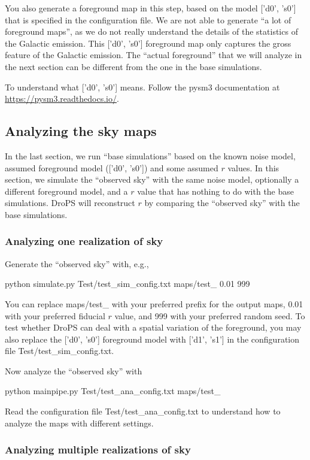 \documentclass[12pt, a4paper]{ctexart} %
\def\tbox#1{\begin{tcolorbox}#1\end{tcolorbox}}
\begin{document}
You also generate a foreground map in this step, based on the model ['d0', 's0'] that is specified in the configuration file. We are not able to generate ``a lot of foreground maps'', as we do not really understand the details of the statistics of the Galactic emission. This ['d0', 's0'] foreground map only captures the gross feature of the Galactic emission. The ``actual foreground'' that we will analyze in the next section can be different from the one in the base simulations.

To understand what ['d0', 's0'] means. Follow the pysm3 documentation at \url{https://pysm3.readthedocs.io/}.

\subsection{Analyzing the sky maps}

In the last section, we run ``base simulations'' based on the known noise model, assumed foreground model (['d0', 's0'])  and some assumed $r$ values. In this section, we simulate the ``observed sky'' with the same noise model, optionally a different foreground model, and a $r$ value that has nothing to do with the base simulations. DroPS will reconstruct $r$ by comparing the ``observed sky'' with  the base simulations.

\subsubsection{Analyzing one realization of sky}

Generate the ``observed sky'' with, e.g.,
\tbox{python simulate.py Test/test\_sim\_config.txt maps/test\_  0.01 999}

You can replace maps/test\_ with your preferred prefix for the output maps, 0.01 with your preferred fiducial $r$ value, and 999 with your preferred random seed. To test whether DroPS can deal with a spatial variation of the foreground, you may also replace the ['d0', 's0'] foreground model with ['d1', 's1'] in the configuration file Test/test\_sim\_config.txt.

Now analyze the ``observed sky'' with
\tbox{python mainpipe.py Test/test\_ana\_config.txt maps/test\_}
Read the configuration file Test/test\_ana\_config.txt to understand how to analyze the maps with different settings.

\subsubsection{Analyzing multiple realizations of sky}
\end{document}
